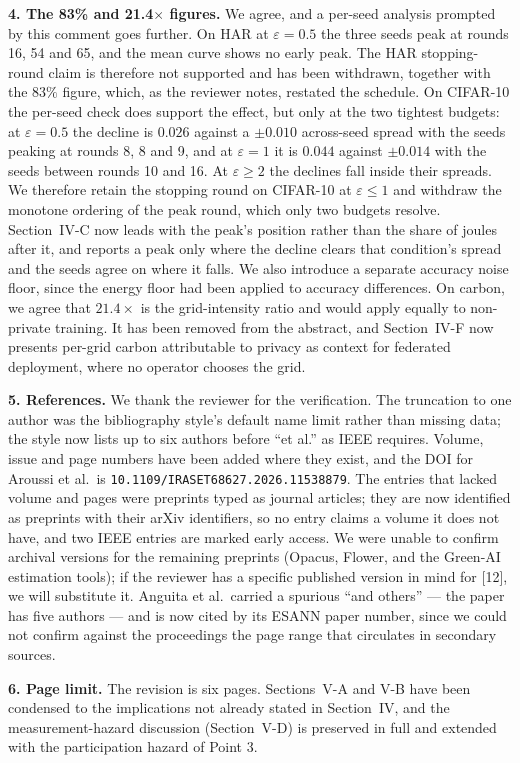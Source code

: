 \documentclass[10pt,a4paper]{article}
\begin{document}
\textbf{4. The 83\% and 21.4$\times$ figures.} We agree, and a per-seed
analysis prompted by this comment goes further. On HAR at $\varepsilon = 0.5$
the three seeds peak at rounds 16, 54 and 65, and the mean curve shows no early
peak. The HAR stopping-round claim is therefore not supported and has been
withdrawn, together with the $83\%$ figure, which, as the reviewer notes,
restated the schedule. On CIFAR-10 the per-seed check does support the effect,
but only at the two tightest budgets: at $\varepsilon = 0.5$ the decline is
$0.026$ against a $\pm 0.010$ across-seed spread with the seeds peaking at
rounds 8, 8 and 9, and at $\varepsilon = 1$ it is $0.044$ against $\pm 0.014$
with the seeds between rounds 10 and 16. At $\varepsilon \ge 2$ the declines
fall inside their spreads. We therefore retain the stopping round on CIFAR-10
at $\varepsilon \le 1$ and withdraw the monotone ordering of the peak round,
which only two budgets resolve. Section~IV-C now leads with the peak's position
rather than the share of joules after it, and reports a peak only where the
decline clears that condition's spread and the seeds agree on where it falls.
We also introduce a separate accuracy noise floor, since the energy floor had
been applied to accuracy differences. On carbon, we agree that $21.4\times$ is
the grid-intensity ratio and would apply equally to non-private training. It
has been removed from the abstract, and Section~IV-F now presents per-grid
carbon attributable to privacy as context for federated deployment, where no
operator chooses the grid.

\textbf{5. References.} We thank the reviewer for the verification. The
truncation to one author was the bibliography style's default name limit rather
than missing data; the style now lists up to six authors before ``et al.'' as
IEEE requires. Volume, issue and page numbers have been added where they exist,
and the DOI for Aroussi et al.\ is
\texttt{10.1109/IRASET68627.2026.11538879}. The entries that lacked volume and
pages were preprints typed as journal articles; they are now identified as
preprints with their arXiv identifiers, so no entry claims a volume it does not
have, and two IEEE entries are marked early access. We were unable to confirm
archival versions for the remaining preprints (Opacus, Flower, and the Green-AI
estimation tools); if the reviewer has a specific published version in mind for
[12], we will substitute it. Anguita et al.\ carried a spurious ``and others''
--- the paper has five authors --- and is now cited by its ESANN paper number,
since we could not confirm against the proceedings the page range that
circulates in secondary sources.

\textbf{6. Page limit.} The revision is six pages. Sections~V-A and V-B have
been condensed to the implications not already stated in Section~IV, and the
measurement-hazard discussion (Section~V-D) is preserved in full and extended
with the participation hazard of Point 3.
\end{document}
